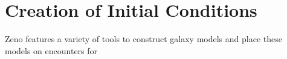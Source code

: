\section{Creation of Initial Conditions}
\label{sec:IC}

Zeno features a variety of tools to construct galaxy models and place these models on encounters for 
